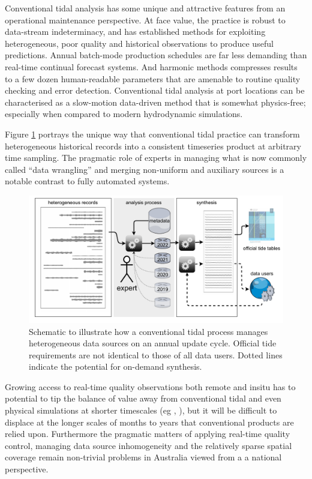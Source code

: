 Conventional tidal analysis has some unique and attractive features from an operational maintenance perspective.
At face value, the practice is robust to data-stream indeterminacy,  and has established methods for exploiting heterogeneous, poor quality and historical observations to produce useful predictions.  
Annual batch-mode production schedules are far less demanding than real-time continual forecast systems. 
And harmonic methods compresses results to a few dozen human-readable parameters that are amenable to routine quality checking and error detection. 
Conventional tidal analysis at port locations can be characterised as a slow-motion data-driven method that is somewhat physics-free; especially when compared to modern hydrodynamic simulations. 

Figure \ref{fig:tidePractice} portrays the unique way that conventional tidal practice can transform heterogeneous historical records into a consistent timeseries product at arbitrary time sampling.
The pragmatic role of experts in managing what is now commonly  called ``data wrangling'' and merging non-uniform and auxiliary sources is a notable contrast to fully automated systems.
 
\begin{figure}[H]\centering
        \includegraphics[width=\figwidthFull]{figures/diagrams/tideSchematic.pdf} 
        \caption{Schematic to illustrate how a conventional tidal process manages heterogeneous data sources on an annual update cycle.  Official tide requirements are not identical to those of all data users.  Dotted lines indicate the potential for on-demand synthesis.}
        \label{fig:tidePractice}
\end{figure}   


Growing access to real-time quality observations both remote and insitu has to potential to tip the balance of value away from conventional tidal and even physical simulations at shorter timescales (eg \citep{10.3389/fmars.2019.00437}, \citep{10.3389/fmars.2020.00260} ), but it will be difficult to displace at the longer scales of months to years that conventional products are relied upon.
Furthermore the pragmatic matters of applying real-time quality control, managing data source inhomogeneity and the relatively sparse spatial coverage remain non-trivial problems in Australia viewed from a a national perspective.


